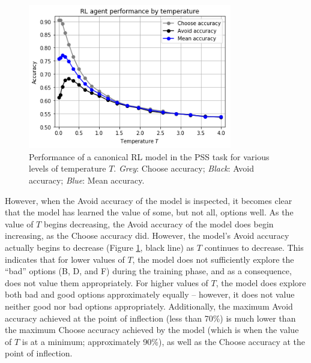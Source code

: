 \documentclass[10pt,letterpaper]{article}
\begin{document}
\begin{figure}[ht]
	\begin{center}
		\includegraphics[width=3.5in]{rl-performance.png}
	\end{center}
	\caption{Performance of a canonical RL model in the PSS task for various levels of temperature $T$. \emph{Grey}: Choose accuracy; \emph{Black}: Avoid accuracy; \emph{Blue}: Mean accuracy.} 
	\label{RL-agent-performance}
\end{figure}



However, when the Avoid accuracy of the model is inspected, it becomes clear that the model has learned the value of some, but not all, options well. As the value of $T$ begins {\color{red} decreasing}, the Avoid accuracy of the model does begin {\color{red} increasing}, as the Choose accuracy did. However, the model's Avoid accuracy actually begins to decrease (Figure \ref{RL-agent-performance}, black line) as $T$ continues to {\color{red} decrease}. This indicates that for lower values of $T$, the model does not sufficiently explore the ``bad'' options (B, D, and F) during the training phase, and as a consequence, does not value them appropriately. For higher values of $T$, the model does explore both bad and good options approximately equally -- however, it does not value neither good nor bad options appropriately. Additionally, the maximum Avoid accuracy achieved at the point of inflection (less than 70\%) is much lower than the maximum Choose accuracy achieved by the model (which is when the value of $T$ is at a minimum; approximately 90\%), as well as the Choose accuracy at the point of inflection. 
\end{document}
